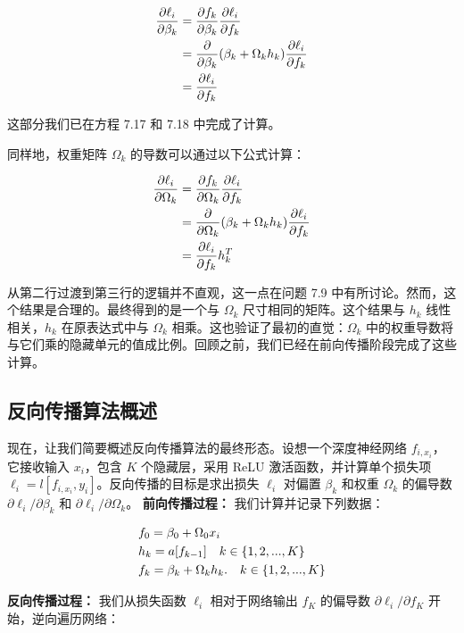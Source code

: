\documentclass[lang=cn,newtx,10pt,scheme=chinese]{elegantbook}
\begin{document}
\begin{align}
\frac{\partial \ell_i}{\partial \beta_k} &= \frac{\partial f_k}{\partial \beta_k} \frac{\partial \ell_i}{\partial f_k} \notag \\
&= \frac{\partial}{\partial \beta_k} (\beta_k + \Omega_k h_k) \frac{\partial \ell_i}{\partial f_k} \notag \\
&= \frac{\partial \ell_i}{\partial f_k} 
\end{align}


这部分我们已在方程 7.17 和 7.18 中完成了计算。

同样地，权重矩阵 \(\Omega_k\) 的导数可以通过以下公式计算：


\begin{align}
\frac{\partial \ell_i}{\partial \Omega_k} &= \frac{\partial f_k}{\partial \Omega_k} \frac{\partial \ell_i}{\partial f_k} \notag \\
&= \frac{\partial}{\partial \Omega_k} (\beta_k + \Omega_k h_k) \frac{\partial \ell_i}{\partial f_k} \notag \\
&= \frac{\partial \ell_i}{\partial f_k} h_k^T 
\end{align}


从第二行过渡到第三行的逻辑并不直观，这一点在问题 7.9 中有所讨论。然而，这个结果是合理的。最终得到的是一个与 \(\Omega_k\) 尺寸相同的矩阵。这个结果与 \(h_k\) 线性相关，\(h_k\) 在原表达式中与 \(\Omega_k\) 相乘。这也验证了最初的直觉：\(\Omega_k\) 中的权重导数将与它们乘的隐藏单元的值成比例。回顾之前，我们已经在前向传播阶段完成了这些计算。
\subsection{反向传播算法概述 }
现在，让我们简要概述反向传播算法的最终形态。设想一个深度神经网络 \(f_{i,x_i}\)，它接收输入 \(x_i\)，包含 \(K\) 个隐藏层，采用 ReLU 激活函数，并计算单个损失项 \(\ell_i = l[f_{i,x_i}, y_i]\)。反向传播的目标是求出损失 \(\ell_i\) 对偏置 \(\beta_k\) 和权重 \(\Omega_k\) 的偏导数 \(\partial \ell_i/\partial \beta_k\) 和 \(\partial \ell_i/\partial \Omega_k\)。 \textbf{前向传播过程：} 我们计算并记录下列数据：


\begin{align}
&f_0 = \beta_0 + \Omega_0 x_i \notag \\
&h_k = a[f_{k-1}] \quad k \in \{1,2,...,K\} \notag \\
&f_k = \beta_k + \Omega_k h_k. \quad k \in \{1,2,...,K\} 
\end{align} 

\textbf{反向传播过程：} 我们从损失函数 \(\ell_i\) 相对于网络输出 \(f_K\) 的偏导数 \(\partial \ell_i/\partial f_K\) 开始，逆向遍历网络：
\end{document}
